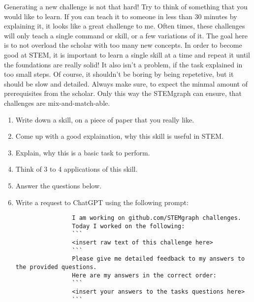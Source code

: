 \begin{challenge}
    \begin{task}
        Generating a new challenge is not that hard! 
        Try to think of something that you would like to learn. 
        If you can teach it to someone in less than 30 minutes by explaining it, it looks like a great challenge to me.
        Often times, these challenges will only teach a single command or skill, or a few variations of it.
        The goal here is to not overload the scholar with too many new concepts. 
        In order to become good at STEM, it is important to learn a single skill at a time and repeat it until the foundations are really solid!
        It also isn't a problem, if the task explained in too small steps. 
        Of course, it shouldn't be boring by being repetetive, but it should be slow and detailed.
        Always make sure, to expect the minmal amount of prerequisites from the scholar. 
        Only this way the STEMgraph can ensure, that challenges are mix-and-match-able.
        \begin{enumerate}
            \item Write down a skill, on a piece of paper that you really like.
            \item Come up with a good explaination, why this skill is useful in STEM. 
            \item Explain, why this is a basic task to perform.
            \item Think of 3 to 4 applications of this skill.
            \item Answer the questions below.
            \item Write a request to ChatGPT using the following prompt:
            \begin{lstlisting}
                I am working on github.com/STEMgraph challenges.
                Today I worked on the following:
                ```
                <insert raw text of this challenge here>
                ```
                Please give me detailed feedback to my answers to the provided questions.
                Here are my answers in the correct order:
                ```
                <insert your answers to the tasks questions here>
                ```
            \end{lstlisting}
        \end{enumerate}


\end{task}
\end{challenge}
